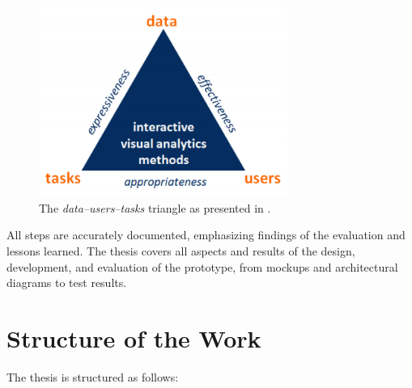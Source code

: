 \begin{figure}[h]
  \centering
  \includegraphics[width=0.725\textwidth]{figures/introduction/cvast-triangle}
  \caption{The \emph{data--users--tasks} triangle as presented in \cite{Miksch2014}.}
  \label{fig:cvast-triangle}
\end{figure}

All steps are accurately documented, emphasizing findings of the evaluation and lessons learned.
The thesis covers all aspects and results of the design, development, and evaluation of the prototype, from mockups and architectural diagrams to test results.


\section{Structure of the Work}

The thesis is structured as follows:

